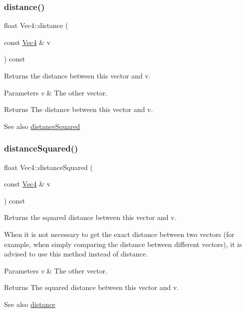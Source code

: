 \subsubsection{\texorpdfstring{distance()}{distance()}\hspace{0.1cm}{\footnotesize\ttfamily [2/2]}}
{\footnotesize\ttfamily float Vec4\+::distance (\begin{DoxyParamCaption}\item[{const \hyperlink{classVec4}{Vec4} \&}]{v }\end{DoxyParamCaption}) const}

Returns the distance between this vector and v.


\begin{DoxyParams}{Parameters}
{\em v} & The other vector.\\
\hline
\end{DoxyParams}
\begin{DoxyReturn}{Returns}
The distance between this vector and v.
\end{DoxyReturn}
\begin{DoxySeeAlso}{See also}
\hyperlink{classVec4_ad8b026a5e96599e253ab0d844fcddb72}{distance\+Squared} 
\end{DoxySeeAlso}
\mbox{\label{classVec4_ad8b026a5e96599e253ab0d844fcddb72}} 
\subsubsection{\texorpdfstring{distance\+Squared()}{distanceSquared()}\hspace{0.1cm}{\footnotesize\ttfamily [1/2]}}
{\footnotesize\ttfamily float Vec4\+::distance\+Squared (\begin{DoxyParamCaption}\item[{const \hyperlink{classVec4}{Vec4} \&}]{v }\end{DoxyParamCaption}) const}

Returns the squared distance between this vector and v.

When it is not necessary to get the exact distance between two vectors (for example, when simply comparing the distance between different vectors), it is advised to use this method instead of distance.


\begin{DoxyParams}{Parameters}
{\em v} & The other vector.\\
\hline
\end{DoxyParams}
\begin{DoxyReturn}{Returns}
The squared distance between this vector and v.
\end{DoxyReturn}
\begin{DoxySeeAlso}{See also}
\hyperlink{classVec4_a067897a2fd0c8b42e73a07e461d83099}{distance} 
\end{DoxySeeAlso}
\mbox{\label{classVec4_ad8b026a5e96599e253ab0d844fcddb72}} 
